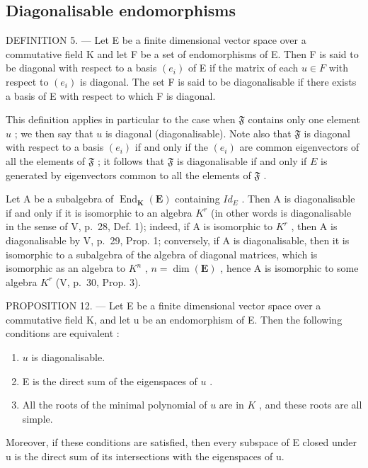 \subsection{Diagonalisable endomorphisms}

DEFINITION 5. --- Let E be a finite dimensional vector space over a commutative field K and let F be a set of endomorphisms of E. Then F is said to be diagonal with respect to a basis \((e_{i})\) of E if the matrix of each \(u \in F\) with respect to \((e_{i})\) is diagonal. The set F is said to be diagonalisable if there exists a basis of E with respect to which F is diagonal.

This definition applies in particular to the case when \(\mathfrak{F}\) contains only one element \(u\) ; we then say that \(u\) is diagonal (diagonalisable). Note also that \(\mathfrak{F}\) is diagonal with respect to a basis \((e_i)\) if and only if the \((e_i)\) are common eigenvectors of all the elements of \(\mathfrak{F}\) ; it follows that \(\mathfrak{F}\) is diagonalisable if and only if \(E\) is generated by eigenvectors common to all the elements of \(\mathfrak{F}\) .

Let A be a subalgebra of \(\operatorname{End}_{\mathbf{K}}(\mathbf{E})\) containing \(Id_{E}\) . Then A is diagonalisable if and only if it is isomorphic to an algebra \(K^{r}\) (in other words is diagonalisable in the sense of V, p.~28, Def. 1); indeed, if A is isomorphic to \(K^{r}\) , then A is diagonalisable by V, p.~29, Prop. 1; conversely, if A is diagonalisable, then it is isomorphic to a subalgebra of the algebra of diagonal matrices, which is isomorphic as an algebra to \(K^{n}\) , \(n = \dim(\mathbf{E})\) , hence A is isomorphic to some algebra \(K^{r}\) (V, p.~30, Prop. 3).

PROPOSITION 12. --- Let E be a finite dimensional vector space over a commutative field K, and let u be an endomorphism of E. Then the following conditions are equivalent :

\begin{enumerate}
\def\labelenumi{(\roman{enumi})}
\item
  \(u\) is diagonalisable.
\item
  E is the direct sum of the eigenspaces of \(u\) .
\item
  All the roots of the minimal polynomial of \(u\) are in \(K\) , and these roots are all simple.
\end{enumerate}

Moreover, if these conditions are satisfied, then every subspace of E closed under u is the direct sum of its intersections with the eigenspaces of u.

